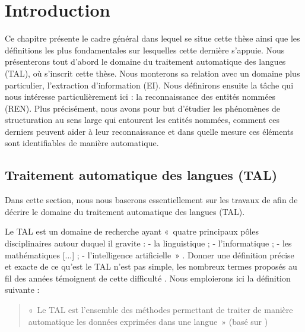 \documentclass[12pt,a4paper,times,twoside,openright]{report}
\begin{document}
\dominitoc
\tableofcontents

\chapter{Introduction}
\label{chap:introduction}
\minitoc

Ce chapitre présente le cadre général dans lequel se situe cette thèse ainsi que les définitions les plus fondamentales sur lesquelles cette dernière s'appuie. Nous présenterons tout d'abord le domaine du traitement automatique des langues (TAL), où s'inscrit cette thèse. Nous monterons sa relation avec un domaine plus particulier, l'extraction d'information (EI). Nous définirons ensuite la tâche qui nous intéresse particulièrement ici : la reconnaissance des entités nommées (REN). Plus précisément, nous avons pour but d'étudier les phénomènes de structuration au sens large qui entourent les entités nommées, comment ces derniers peuvent aider à leur reconnaissance et dans quelle mesure ces éléments sont identifiables de manière automatique.

    \section{Traitement automatique des langues (TAL)}
    \label{sec:NLP}
Dans cette section, nous nous baserons essentiellement sur les travaux de \citet{cori2002constitution} afin de décrire le domaine du traitement automatique des langues (TAL).

Le TAL est un domaine de recherche ayant «\ quatre principaux pôles disciplinaires autour duquel il gravite : - la linguistique ; - l'informatique ; - les mathématiques [...] ; - l'intelligence artificielle\ » \citep{cori2002constitution}. Donner une définition précise et exacte de ce qu'est le TAL n'est pas simple, les nombreux termes proposés au fil des années témoignent de cette difficulté \citep{vauquois1969dix,cori2002constitution}. Nous emploierons ici la définition suivante :

\begin{quote}«\ Le TAL est l'ensemble des méthodes permettant de traiter de manière automatique les données exprimées dans une langue\ » (basé sur \citet{cori2002constitution,fuchs2004traitement})\end{quote}
\end{document}
